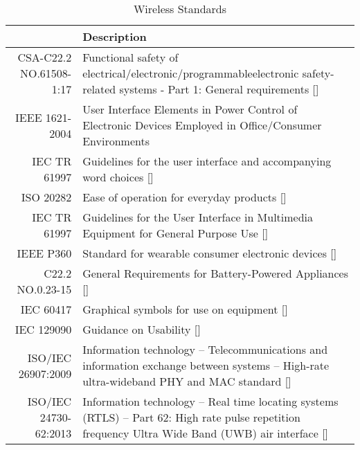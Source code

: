 \def\arraystretch{1.5}
\begin{table}[H]
\centering
\begin{tabular}{ | p{3.5cm} | p{11.5cm}| } 
\hline
\rowcolor{lightgray} \multicolumn{1}{|r|}{\textbf{Standard Code}} & \textbf{Description}\\ 
\hline
\multicolumn{1}{|r|}{CSA-C22.2 NO.61508-1:17} & Functional safety of electrical/electronic/programmableelectronic safety-related systems - Part 1: General requirements []\\ 
\hline
\multicolumn{1}{|r|}{IEEE 1621-2004} & User Interface Elements in Power Control of Electronic Devices Employed in Office/Consumer Environments \\ 
\hline
\multicolumn{1}{|r|}{IEC TR 61997} & Guidelines for the user interface and accompanying word choices [] \\ 
\hline
\multicolumn{1}{|r|}{ISO 20282} & Ease of operation for everyday products [] \\ 
\hline
\multicolumn{1}{|r|}{IEC TR 61997} & Guidelines for the User Interface in Multimedia Equipment for General Purpose Use [] \\ 
\hline
\multicolumn{1}{|r|}{IEEE P360} & Standard for wearable consumer electronic devices []\\ 
\hline
\multicolumn{1}{|r|}{C22.2 NO.0.23-15} & General Requirements for Battery-Powered Appliances []\\ 
\hline
\multicolumn{1}{|r|}{IEC 60417} & Graphical symbols for use on equipment []\\ 
\hline
\multicolumn{1}{|r|}{IEC 129090} & Guidance on Usability []\\ 
\hline
\multicolumn{1}{|r|}{ISO/IEC 26907:2009} & Information technology -- Telecommunications and information exchange between systems -- High-rate ultra-wideband PHY and MAC standard [] \\
\hline
\multicolumn{1}{|r|}{ISO/IEC 24730-62:2013} & Information technology -- Real time locating systems (RTLS) -- Part 62: High rate pulse repetition frequency Ultra Wide Band (UWB) air interface []\\ 
\hline
\end{tabular}
\caption{Wireless Standards}
\end{table}	









